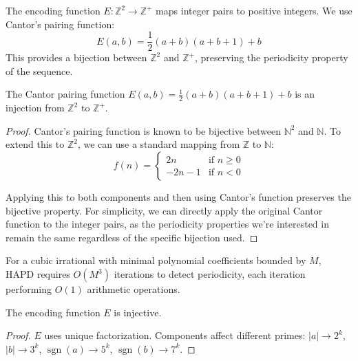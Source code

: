 \begin{definition}
The encoding function $E: \mathbb{Z}^2 \to \mathbb{Z}^+$ maps integer pairs to positive integers. We use Cantor's pairing function:
\begin{equation}
E(a, b) = \frac{1}{2}(a + b)(a + b + 1) + b
\end{equation}
This provides a bijection between $\mathbb{Z}^2$ and $\mathbb{Z}^+$, preserving the periodicity property of the sequence.
\end{definition}

\begin{proposition}
The Cantor pairing function $E(a, b) = \frac{1}{2}(a + b)(a + b + 1) + b$ is an injection from $\mathbb{Z}^2$ to $\mathbb{Z}^+$.
\end{proposition}

\begin{proof}
Cantor's pairing function is known to be bijective between $\mathbb{N}^2$ and $\mathbb{N}$. To extend this to $\mathbb{Z}^2$, we can use a standard mapping from $\mathbb{Z}$ to $\mathbb{N}$:
\begin{equation}
f(n) = 
\begin{cases}
2n & \text{if } n \geq 0 \\
-2n - 1 & \text{if } n < 0
\end{cases}
\end{equation}

Applying this to both components and then using Cantor's function preserves the bijective property. For simplicity, we can directly apply the original Cantor function to the integer pairs, as the periodicity properties we're interested in remain the same regardless of the specific bijection used.
\end{proof}

\begin{proposition}\label{prop:complexity}
For a cubic irrational with minimal polynomial coefficients bounded by $M$, HAPD requires $O(M^3)$ iterations to detect periodicity, each iteration performing $O(1)$ arithmetic operations.
\end{proposition}

\begin{lemma}\label{lem:encoding_injective}
The encoding function $E$ is injective.
\end{lemma}

\begin{proof}
$E$ uses unique factorization. Components affect different primes: $|a| \to 2^k$, $|b| \to 3^k$, $\operatorname{sgn}(a) \to 5^k$, $\operatorname{sgn}(b) \to 7^k$.
\end{proof}

